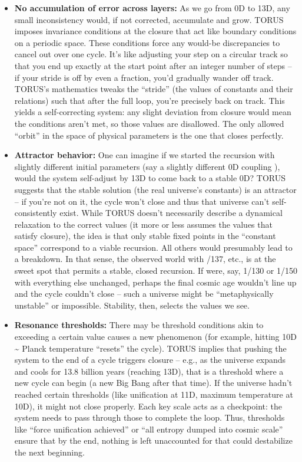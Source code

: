 \documentclass[
]{article}
\begin{document}
\begin{itemize}
\item
  \textbf{No accumulation of error across layers:} As we go from 0D to
  13D, any small inconsistency would, if not corrected, accumulate and
  grow. TORUS imposes invariance conditions at the closure that act like
  boundary conditions on a periodic space\hspace{0pt}. These conditions
  force any would-be discrepancies to cancel out over one cycle. It's
  like adjusting your step on a circular track so that you end up
  exactly at the start point after an integer number of steps -- if your
  stride is off by even a fraction, you'd gradually wander off track.
  TORUS's mathematics tweaks the ``stride'' (the values of constants and
  their relations) such that after the full loop, you're precisely back
  on track. This yields a self-correcting system: any slight deviation
  from closure would mean the conditions aren't met, so those values are
  disallowed. The only allowed ``orbit'' in the space of physical
  parameters is the one that closes perfectly.
\item
  \textbf{Attractor behavior:} One can imagine if we started the
  recursion with slightly different initial parameters (say a slightly
  different 0D coupling \alpha), would the system self-adjust by 13D to come
  back to a stable 0D? TORUS suggests that the stable solution (the real
  universe's constants) is an attractor -- if you're not on it, the
  cycle won't close and thus that universe can't self-consistently
  exist. While TORUS doesn't necessarily describe a dynamical relaxation
  to the correct values (it more or less assumes the values that satisfy
  closure), the idea is that only stable fixed points in the ``constant
  space'' correspond to a viable recursion. All others would presumably
  lead to a breakdown. In that sense, the observed world with \alpha {}/137,
  etc., is at the sweet spot that permits a stable, closed recursion. If
  \alpha were, say, 1/130 or 1/150 with everything else unchanged, perhaps
  the final cosmic age wouldn't line up and the cycle couldn't close --
  such a universe might be ``metaphysically unstable'' or impossible.
  Stability, then, selects the values we see.
\item
  \textbf{Resonance thresholds:} There may be threshold conditions akin
  to exceeding a certain value causes a new phenomenon (for example,
  hitting 10D \textasciitilde{} Planck temperature ``resets'' the
  cycle). TORUS implies that pushing the system to the end of a cycle
  triggers closure -- e.g., as the universe expands and cools for 13.8
  billion years (reaching 13D), that is a threshold where a new cycle
  can begin (a new Big Bang after that time). If the universe hadn't
  reached certain thresholds (like unification at 11D, maximum
  temperature at 10D), it might not close properly. Each key scale acts
  as a checkpoint: the system needs to pass through those to complete
  the loop. Thus, thresholds like ``force unification achieved'' or
  ``all entropy dumped into cosmic scale'' ensure that by the end,
  nothing is left unaccounted for that could destabilize the next
  beginning.
\end{itemize}
\end{document}
